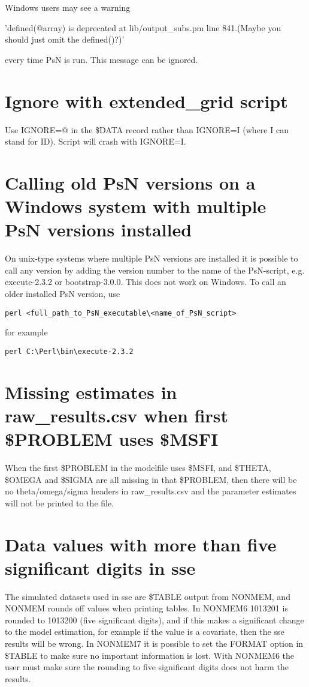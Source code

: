 Windows users may see a warning 

'defined(@array) is deprecated at lib/output\_subs.pm line 841.(Maybe you should just omit the defined()?)' 

every time PsN is run. This message can be ignored.

\section{Ignore with extended\_grid script}
Use IGNORE=@ in the \$DATA record rather than IGNORE=I (where I can stand for ID). Script will crash with IGNORE=I.

\section{Calling old PsN versions on a Windows system with multiple PsN versions installed}
On unix-type systems where multiple PsN versions are installed it is possible to call any version by adding the version number to the name of the PsN-script, e.g. execute-2.3.2 or bootstrap-3.0.0. This does not work on Windows. To call an older installed PsN version, use 

\begin{verbatim}
perl <full_path_to_PsN_executable\<name_of_PsN_script>
\end{verbatim}

for example

\begin{verbatim}
perl C:\Perl\bin\execute-2.3.2
\end{verbatim}

\section{Missing estimates in raw\_results.csv when first \$PROBLEM uses \$MSFI}
When the first \$PROBLEM in the modelfile uses \$MSFI, and \$THETA, \$OMEGA and \$SIGMA are all missing in that \$PROBLEM, then there will be no theta/omega/sigma headers in raw\_results.csv and the parameter estimates will not be printed to the file.

\section{Data values with more than five significant digits in sse}
The simulated datasets used in sse are \$TABLE output from NONMEM, and NONMEM rounds off values when printing tables. In NONMEM6 1013201 is rounded to 1013200 (five significant digits), and if this makes a significant change to the model estimation, for example if the value is a covariate, then the sse results will be wrong. In NONMEM7 it is possible to set the FORMAT option in \$TABLE to make sure no important information is lost. With NONMEM6 the user must make sure the rounding to five significant digits does not harm the results.



